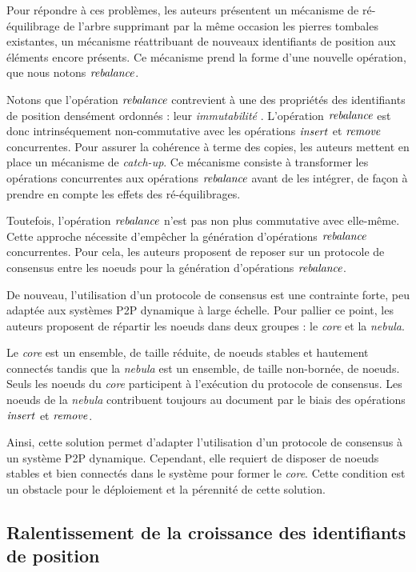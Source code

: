 Pour répondre à ces problèmes, les auteurs présentent un mécanisme de ré-équilibrage de l'arbre supprimant par la même occasion les pierres tombales existantes, \ie un mécanisme réattribuant de nouveaux identifiants de position aux éléments encore présents.
Ce mécanisme prend la forme d'une nouvelle opération, que nous notons $\mathit{rebalance}$.

Notons que l'opération $\mathit{rebalance}$ contrevient à une des propriétés des identifiants de position densément ordonnés : leur \emph{immutabilité} .
L'opération $\mathit{rebalance}$ est donc intrinséquement non-commutative avec les opérations $\mathit{insert}$ et $\mathit{remove}$ concurrentes.
Pour assurer la cohérence à terme des copies, les auteurs mettent en place un mécanisme de \emph{catch-up}.
Ce mécanisme consiste à transformer les opérations concurrentes aux opérations $\mathit{rebalance}$ avant de les intégrer, de façon à prendre en compte les effets des ré-équilibrages.

Toutefois, l'opération $\mathit{rebalance}$ n'est pas non plus commutative avec elle-même.
Cette approche nécessite d'empêcher la génération d'opérations $\mathit{rebalance}$ concurrentes.
Pour cela, les auteurs proposent de reposer sur un protocole de consensus entre les noeuds pour la génération d'opérations $\mathit{rebalance}$.

De nouveau, l'utilisation d'un protocole de consensus est une contrainte forte, peu adaptée aux systèmes \ac{P2P} dynamique à large échelle.
Pour pallier ce point, les auteurs proposent de répartir les noeuds dans deux groupes : le \emph{core} et la \emph{nebula}.

Le \emph{core} est un ensemble, de taille réduite, de noeuds stables et hautement connectés tandis que la \emph{nebula} est un ensemble, de taille non-bornée, de noeuds.
Seuls les noeuds du \emph{core} participent à l'exécution du protocole de consensus.
Les noeuds de la \emph{nebula} contribuent toujours au document par le biais des opérations $\mathit{insert}$ et $\mathit{remove}$.

Ainsi, cette solution permet d'adapter l'utilisation d'un protocole de consensus à un système \ac{P2P} dynamique.
Cependant, elle requiert de disposer de noeuds stables et bien connectés dans le système pour former le \emph{core}.
Cette condition est un obstacle pour le déploiement et la pérennité de cette solution.

\subsection{Ralentissement de la croissance des identifiants de position}
\label{sec:etat-art-lseq}

